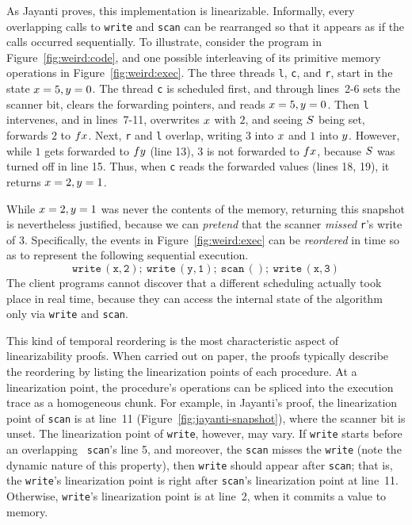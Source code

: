 
 
As Jayanti proves, this implementation is
linearizable. Informally, every overlapping calls to {\tt write} and
{\tt scan} can be rearranged so that it appears as if the calls
occurred sequentially.  To illustrate, consider the program in
Figure~\ref{fig:weird:code}, and one possible interleaving of its
primitive memory operations in Figure~\ref{fig:weird:exec}. The three
threads {\tt l}, {\tt c}, and {\tt r}, start in the state
$x = 5, y = 0$.
%
The thread {\tt c} is scheduled first, and through lines~2-6 sets the
scanner bit, clears the forwarding pointers, and reads $x = 5, y =
0$. Then {\tt l} intervenes, and in lines~7-11, overwrites $x$ with
$2$, and seeing $S$ being set, forwards $2$ to $fx$. Next, {\tt r}
and {\tt l} overlap, writing $3$ into $x$ and $1$ into $y$. However,
while $1$ gets forwarded to $fy$ (line 13), $3$ is not forwarded to
$fx$, because $S$ was turned off in line 15. Thus, when {\tt c}
reads the forwarded values (lines 18, 19), it returns $x = 2, y =
1$.

While $x=2, y=1$ was never the contents of the memory, returning
this snapshot is nevertheless justified, because we can \emph{pretend}
that the scanner \emph{missed} {\tt r}'s write of $3$. Specifically,
the events in Figure~\ref{fig:weird:exec} can be \emph{reordered} in
time so as to represent the following sequential execution.
%
\begin{equation}
\mathtt{write\, (x, 2);\ write\, (y,1);\ scan\, ();\ write\, (x,
  3)} \label{eq:lin}
\end{equation}
The client programs cannot discover that a different scheduling
actually took place in real time, because they can access the internal
state of the algorithm only via {\tt write} and {\tt scan}.

This kind of temporal reordering is the most characteristic aspect of
linearizability proofs. When carried out on paper, the proofs
typically describe the reordering by listing the linearization points
of each procedure. At a linearization point, the procedure's
operations can be spliced into the execution trace as a homogeneous
chunk. For example, in Jayanti's proof, the linearization point of
{\tt scan} is at line~11 (Figure~\ref{fig:jayanti-snapshot}), where
the scanner bit is unset. The linearization point of {\tt write},
however, may vary. If {\tt write} starts before an overlapping {\tt
  scan}'s line 5, and moreover, the {\tt scan} misses the {\tt write}
(note the dynamic nature of this property), then {\tt write} should
appear after {\tt scan}; that is, the {\tt write}'s linearization
point is right after {\tt scan}'s linearization point at
line~11. Otherwise, {\tt write}'s linearization point is at line~2,
when it commits a value to memory.

